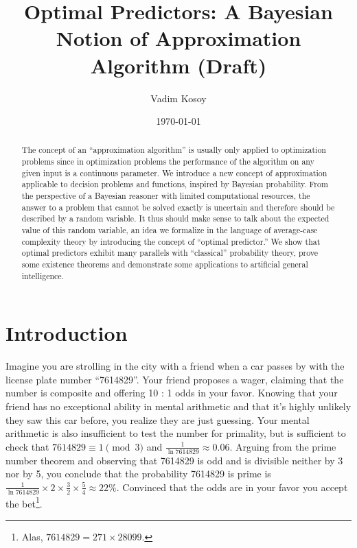 \documentclass{article}
\numberwithin{equation}{section}
\theoremstyle{definition}
\theoremstyle{plain}
\begin{document}
\title{Optimal Predictors: A Bayesian Notion of Approximation Algorithm (Draft)}

\author{Vadim Kosoy}

\date{\today}

\maketitle

\begin{abstract}
The concept of an \enquote{approximation algorithm} is usually only applied to optimization problems since in optimization problems the performance of the algorithm on any given input is a continuous parameter. We introduce a new concept of approximation applicable to decision problems and functions, inspired by Bayesian probability. From the perspective of a Bayesian reasoner with limited computational resources, the answer to a problem that cannot be solved exactly is uncertain and therefore should be described by a random variable. It thus should make sense to talk about the expected value of this random variable, an idea we formalize in the language of average-case complexity theory by introducing the concept of \enquote{optimal predictor.} We show that optimal predictors exhibit many parallels with \enquote{classical} probability theory, prove some existence theorems and demonstrate some applications to artificial general intelligence.%
\end{abstract}%

\section*{Introduction}
%
Imagine you are strolling in the city with a friend when a car passes by with the license plate number \enquote{7614829}. Your friend proposes a wager, claiming that the number is composite and offering 10 : 1 odds in your favor. Knowing that your friend has no exceptional ability in mental arithmetic and that it's highly unlikely they saw this car before, you realize they are just guessing. Your mental arithmetic is also insufficient to test the number for primality, but is sufficient to check that ${7614829 \equiv 1 \pmod{3}}$ and $\frac{1}{\ln 7614829} \approx 0.06$. Arguing from the prime number theorem and observing that 7614829 is odd and is divisible neither by 3 nor by 5, you conclude that the probability 7614829 is prime is ${\frac{1}{\ln 7614829} \times 2 \times \frac{3}{2} \times \frac{5}{4} \approx 22\%}$. Convinced that the odds are in your favor you accept the bet\footnote{Alas, $7614829 = 271 \times 28099$.}.
\end{document}
